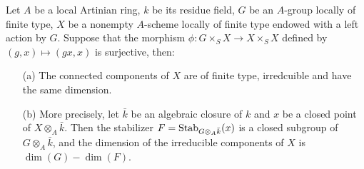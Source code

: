 \begin{proposition}\label{scheme A-group-object transitive prop}
Let $A$ be a local Artinian ring, $k$ be its residue field, $G$ be an $A$-group locally of finite type, $X$ be a nonempty $A$-scheme locally of finite type endowed with a left action by $G$. Suppose that the morphism $\phi:G\times_SX\to X\times_SX$ defined by $(g,x)\mapsto(gx,x)$ is surjective, then:
\begin{enumerate}
    \item[(a)] The connected components of $X$ are of finite type, irredcuible and have the same dimension.
    \item[(b)] More precisely, let $\bar{k}$ be an algebraic closure of $k$ and $x$ be a closed point of $X\otimes_A\bar{k}$. Then the stabilizer $F=\mathrm{Stab}_{G\otimes_A\bar{k}}(x)$ is a closed subgroup of $G\otimes_A\bar{k}$, and the dimension of the irreducible components of $X$ is $\dim(G)-\dim(F)$.
\end{enumerate}
\end{proposition}
